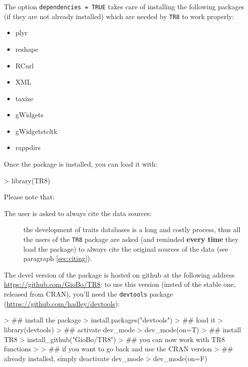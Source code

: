 \documentclass{article}
\begin{document}
The option \texttt{dependencies = TRUE} takes care of installing the
following packages (if they are not already installed) which are
needed by \texttt{TR8} to work properly: 

 \begin{itemize}
  \item plyr\cite{plyr}
  \item reshape\cite{reshape}
  \item RCurl\cite{RCurl}
  \item XML\cite{XML}
  \item taxize\cite{taxize}
  \item gWidgets\cite{gWidgets}
  \item gWidgetstcltk
  \item rappdirs
  \end{itemize}
  

  
  Once the package is installed, you can load it with:

\begin{Schunk}
\begin{Sinput}
> library(TR8)
\end{Sinput}
\end{Schunk}

Please note that:

\begin{description}
\item[The user is asked to always cite the data sources: ] the
  development of traits databases is a long and costly process,
  thus all the users of the \texttt{TR8} package are asked (and
  reminded \textbf{every time} they load the package) to always cite the original sources of the data (see
  paragraph \ref{sec:citing}).
  
\end{description}

  The devel version of the package is hosted on github at the
  following address \url{https://github.com/GioBo/TR8}: to use this
  version (insted of the stable one, released from CRAN), you'll need
  the \texttt{devtools} package (\url{https://github.com/hadley/devtools}):
  
\begin{Schunk}
\begin{Sinput}
> ## install the package
> install.packages("devtools")
> ## load it
> library(devtools)
> ## activate dev_mode
> dev_mode(on=T)
> ## install TR8
> install_github("GioBo/TR8")
> ## you can now work with TR8 functions
> 
> ## if you want to go back and use the CRAN version
> ## already installed, simply deactivate dev_mode
> dev_mode(on=F)
\end{Sinput}
\end{Schunk}
  
\end{document}
